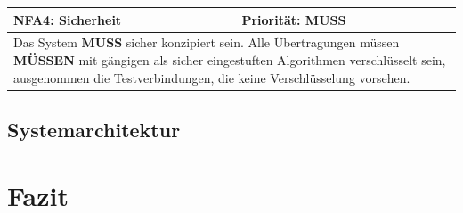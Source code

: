 \documentclass[titlepage]{report}
\begin{document}
\begin{center}
\begin{tabular}{p{}>{\raggedleft\arraybackslash}p{}}\toprule
    \textbf{NFA4: Sicherheit} & \textbf{Priorität: MUSS} \\\midrule
	\multicolumn{2}{p{\textwidth-\tabcolsep}}{%
        Das System \textbf{MUSS} sicher konzipiert sein.
        Alle Übertragungen müssen \textbf{MÜSSEN} mit gängigen
        als sicher eingestuften Algorithmen verschlüsselt sein,
        ausgenommen die Testverbindungen, die keine Verschlüsselung
        vorsehen.
        }\\\bottomrule
\end{tabular}
\end{center}
\section*{Systemarchitektur}
\chapter*{Fazit}
\nocite{*}
\printbibliography{}
\listoffigures
\printglossary{}
\end{document}
